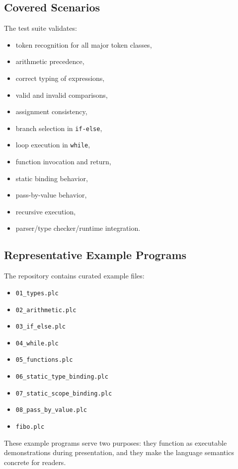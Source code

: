 \documentclass[12pt,a4paper]{article}
\begin{document}
\subsection{Covered Scenarios}
The test suite validates:

\begin{itemize}[leftmargin=1.0cm]
    \item token recognition for all major token classes,
    \item arithmetic precedence,
    \item correct typing of expressions,
    \item valid and invalid comparisons,
    \item assignment consistency,
    \item branch selection in \texttt{if-else},
    \item loop execution in \texttt{while},
    \item function invocation and return,
    \item static binding behavior,
    \item pass-by-value behavior,
    \item recursive execution,
    \item parser/type checker/runtime integration.
\end{itemize}

\subsection{Representative Example Programs}
The repository contains curated example files:

\begin{itemize}[leftmargin=1.0cm]
    \item \texttt{01\_types.plc}
    \item \texttt{02\_arithmetic.plc}
    \item \texttt{03\_if\_else.plc}
    \item \texttt{04\_while.plc}
    \item \texttt{05\_functions.plc}
    \item \texttt{06\_static\_type\_binding.plc}
    \item \texttt{07\_static\_scope\_binding.plc}
    \item \texttt{08\_pass\_by\_value.plc}
    \item \texttt{fibo.plc}
\end{itemize}

These example programs serve two purposes: they function as executable demonstrations during presentation, and they make the language semantics concrete for readers.
\end{document}
